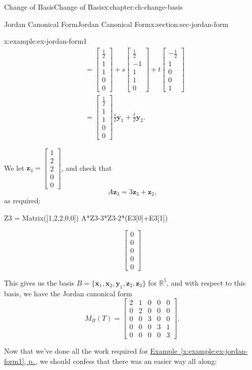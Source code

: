 \documentclass[oneside,10pt,]{book}
\newcommand{\xreffont}{\relax}
\numberwithin{equation}{section}
\newcommand{\bbm}{\begin{bmatrix}}
\newcommand{\ebm}{\end{bmatrix}}
\newcommand{\R}{\mathbb{R}}
\newcommand{\zz}{\mathbf{z}}
\newcommand{\xx}{\mathbf{x}}
\newcommand{\yy}{\mathbf{y}}
\newcommand{\amp}{&}
\begin{document}
\begin{chapterptx}{Change of Basis}{}{Change of Basis}{}{}{x:chapter:ch-change-basis}
\begin{sectionptx}{Jordan Canonical Form}{}{Jordan Canonical Form}{}{}{x:section:sec-jordan-form}
\begin{example}{}{x:example:ex-jordan-form1}
\begin{align*}
\amp = \bbm \frac12\\1\\1\\0\\0\ebm + s\bbm\frac12\\-1\\1\\1\\0\ebm+t\bbm -\frac12\\1\\0\\0\\1\ebm\\
\amp = \bbm \frac12\\1\\1\\0\\0\ebm \frac{s}{2}\yy_1+\frac{t}{2}\yy_2\text{.}
\end{align*}
%
\par
We let \(\zz_3 = \bbm 1 \\ 2 \\ 2 \\ 0 \\ 0\ebm\), and check that%
\begin{equation*}
A\zz_3 = 3\zz_3+\zz_2\text{,}
\end{equation*}
as required:%
\begin{sageinput}
Z3 = Matrix([1,2,2,0,0])
A*Z3-3*Z3-2*(E3[0]+E3[1])
\end{sageinput}
\begin{sageoutput}
\[\bbm 0\\0\\0\\0\\0\ebm\]
\end{sageoutput}
This gives us the basis \(B = \{\xx_1,\xx_2,\yy_1,\zz_2,\zz_3\}\) for \(\R^5\), and with respect to this basis, we have the Jordan canonical form%
\begin{equation*}
M_B(T) = \bbm 2 \amp 1\amp 0\amp 0 \amp 0\\
0 \amp 2\amp 0\amp 0 \amp 0\\
0 \amp 0\amp 3\amp 0 \amp 0\\
0 \amp 0\amp 0\amp 3 \amp 1\\
0 \amp 0\amp 0\amp 0 \amp 3\ebm\text{.}
\end{equation*}
%
\par
Now that we've done all the work required for \hyperref[x:example:ex-jordan-form1]{Example~{\xreffont\ref{x:example:ex-jordan-form1}}, p.\,\pageref{x:example:ex-jordan-form1}}, we should confess that there was an easier way all along:%

\end{example}
\end{sectionptx}
\end{chapterptx}
\end{document}

